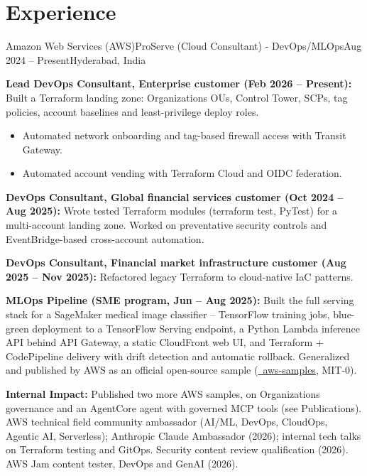 \section{\textbf{Experience}}
\resumeSubHeadingListStart

\resumeExp
{Amazon Web Services (AWS)}{ProServe (Cloud Consultant) - DevOps/MLOps}{Aug 2024 -- Present}{Hyderabad, India}
\resumeItemListStart
    \item[$\diamond$] \textbf{Lead DevOps Consultant, Enterprise customer (Feb 2026 -- Present):} Built a Terraform landing zone: Organizations OUs, Control Tower, SCPs, tag policies, account baselines and least-privilege deploy roles.
    \begin{itemize}[leftmargin=2.5ex, noitemsep, topsep=0pt, labelsep=1.2mm]
        \item[$\circ$] Automated network onboarding and tag-based firewall access with Transit Gateway.
        \item[$\circ$] Automated account vending with Terraform Cloud and OIDC federation.
    \end{itemize}
    \item[$\diamond$] \textbf{DevOps Consultant, Global financial services customer (Oct 2024 -- Aug 2025):} Wrote tested Terraform modules (terraform test, PyTest) for a multi-account landing zone. Worked on preventative security controls and EventBridge-based cross-account automation.
    \item[$\diamond$] \textbf{DevOps Consultant, Financial market infrastructure customer (Aug 2025 -- Nov 2025):} Refactored legacy Terraform to cloud-native IaC patterns.
    \item[$\diamond$] \textbf{MLOps Pipeline (SME program, Jun -- Aug 2025):} Built the full serving stack for a SageMaker medical image classifier -- TensorFlow training jobs, blue-green deployment to a TensorFlow Serving endpoint, a Python Lambda inference API behind API Gateway, a static CloudFront web UI, and Terraform + CodePipeline delivery with drift detection and automatic rollback. Generalized and published by AWS as an official open-source sample (\href{https://github.com/aws-samples/sample-sagemaker-image-classification-mlops}{\faGithub\ aws-samples}, MIT-0).
    \item[$\diamond$] \textbf{Internal Impact:} Published two more AWS samples, on Organizations governance and an AgentCore agent with governed MCP tools (see Publications). AWS technical field community ambassador (AI/ML, DevOps, CloudOps, Agentic AI, Serverless); Anthropic Claude Ambassador (2026); internal tech talks on Terraform testing and GitOps. Security content review qualification (2026). AWS Jam content tester, DevOps and GenAI (2026).
\resumeItemListEnd

